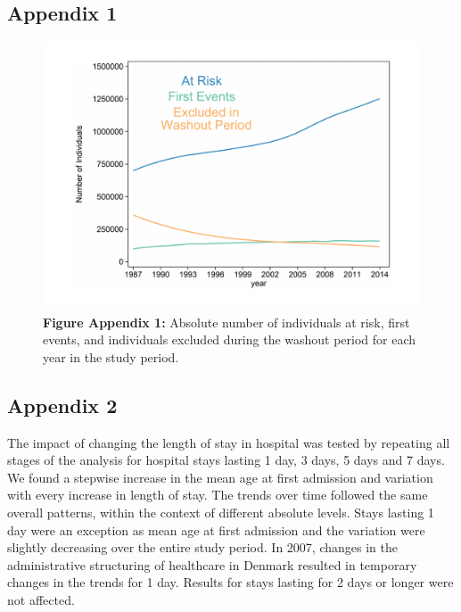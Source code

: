 \subsection{Appendix 1}
	\begin{figure}[H]
		\centering
		\includegraphics[scale=0.5]{Paper_3/Appendix_1.pdf}
		\caption*{\textbf{Figure Appendix 1:} 	Absolute number of individuals at 
												risk, first events, and individuals 
												excluded during the washout period 
												for each year in the study period.}
	\label{ch4:app1}
	\end{figure}




\newpage

\subsection{Appendix 2}

\label{ch4:app2}

The impact of changing the length of stay in hospital was tested by repeating all 
stages of the analysis for hospital stays lasting 1 day, 3 days, 5 days and 7 days. 
We found a stepwise increase in the mean age at first admission and variation with 
every increase in length of stay. The trends over time followed the same overall 
patterns, within the context of different absolute levels. Stays lasting 1 day were 
an exception as mean age at first admission and the variation were slightly decreasing 
over the entire study period. In 2007, changes in the administrative structuring of 
healthcare in Denmark resulted in temporary changes in the trends for 1 day. Results 
for stays lasting for 2 days or longer were not affected.

